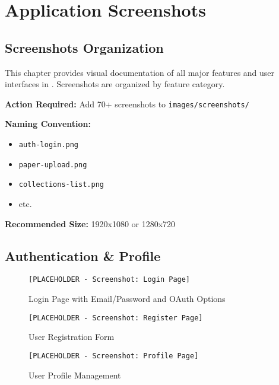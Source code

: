 \chapter{Application Screenshots}
\label{ch:screenshots}

\section{Screenshots Organization}
\label{sec:screenshots-organization}

This chapter provides visual documentation of all major features and user interfaces in \projectname{}. Screenshots are organized by feature category.

\begin{warningbox}
\textbf{Action Required:} Add 70+ screenshots to \texttt{images/screenshots/}

\textbf{Naming Convention:}
\begin{itemize}
    \item \texttt{auth-login.png}
    \item \texttt{paper-upload.png}
    \item \texttt{collections-list.png}
    \item etc.
\end{itemize}

\textbf{Recommended Size:} 1920x1080 or 1280x720
\end{warningbox}

\section{Authentication \& Profile}
\label{sec:screenshots-auth}

\begin{figure}[H]
\centering
\texttt{[PLACEHOLDER - Screenshot: Login Page]}
\caption{Login Page with Email/Password and OAuth Options}
\label{fig:screenshot-login}
\end{figure}

\begin{figure}[H]
\centering
\texttt{[PLACEHOLDER - Screenshot: Register Page]}
\caption{User Registration Form}
\label{fig:screenshot-register}
\end{figure}

\begin{figure}[H]
\centering
\texttt{[PLACEHOLDER - Screenshot: Profile Page]}
\caption{User Profile Management}
\label{fig:screenshot-profile}
\end{figure}


